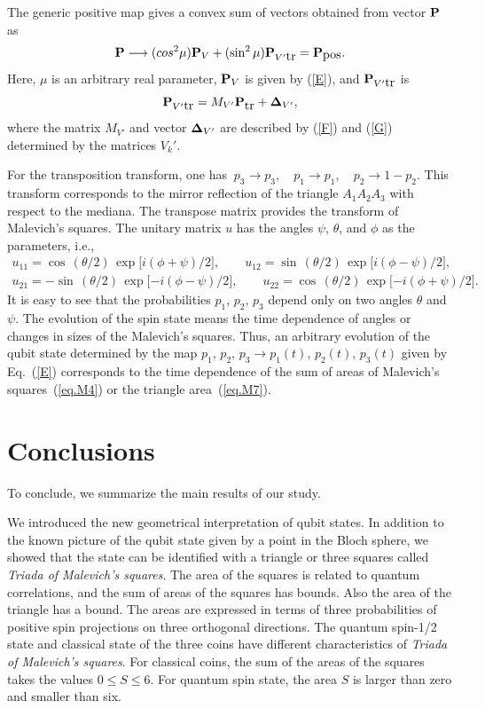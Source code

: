 \documentclass[12pt]{article}
\begin{document}
The generic positive map gives a convex sum of vectors obtained from vector ${\bf P}$ as
\[
{\bf P}\longrightarrow(cos^2\mu){\bf P}_V+(\sin^2\mu){\bf P}_{V'\mbox{tr}}={\bf P}_{\mbox{pos}}.
\]
Here, $\mu$ is an arbitrary real parameter, ${\bf P}_V $ is given by
(\ref{E}), and ${\bf P}_{V'\mbox{tr}}$ is
\[
{\bf P}_{V'\mbox{tr}}=M_{V'}{\bf P}_{\mbox{tr}}+{\bf \Delta}_{V'},
\]
where the matrix $M_{V'}$ and vector ${\bf \Delta}_{V'}$ are described  by (\ref{F})
and (\ref{G}) determined by the matrices $V_k'$.

For the transposition transform, one has $~p_3\longrightarrow
p_3,\quad p_1\longrightarrow p_1, \quad p_2\longrightarrow1-p_2.$
This transform corresponds to the mirror reflection of the triangle
$A_1A_2A_3$ with respect to the mediana. The transpose matrix
provides the transform of Malevich's squares. The unitary matrix $u$
has the angles $\psi$, $\theta$, and $\phi$ as the parameters, i.e.,
\begin{eqnarray*}
u_{11}=\cos\,({\theta}/{2})\,\exp\big[{i(\phi+\psi)}/{2}\big],
\qquad
u_{12}=\sin\,({\theta}/{2})\,\exp\big[{i(\phi-\psi)}/{2}\big],\\
u_{21}=-\sin\,({\theta}/{2})\,\exp\big[{-i(\phi-\psi)}/{2}\big],
\qquad u_{22}=\cos\,({\theta}/{2})\,\exp\big[{-i(\phi+\psi)}/{2}\big].
\end{eqnarray*}
It is easy to see that the probabilities $p_1,\,p_2,\,p_3$ depend
only on two angles $\theta$ and $\psi$. The evolution of the spin
state means the time dependence of angles or changes in sizes of the
Malevich's squares. Thus, an arbitrary evolution of the qubit state
determined by the map $p_1,\,p_2,\,p_3\longrightarrow
p_1(t),\,p_2(t),\,p_3(t)$ given by Eq.~(\ref{E}) corresponds to the
time dependence of the sum of areas of Malevich's
squares~(\ref{eq.M4}) or the triangle area~(\ref{eq.M7}).\\[-5.1mm]

\section{Conclusions}   
To conclude, we summarize the main results of our study.

We introduced the new geometrical interpretation of qubit states. In
addition to the known picture of the qubit state given by a point in
the Bloch sphere, we showed that the state can be identified with a
triangle or three squares called {\it Triada of Malevich's squares}.
The area of the squares is related to quantum correlations, and the
sum of areas of the squares has bounds. Also the area of the
triangle has a bound. The areas are expressed in terms of three
probabilities of positive spin projections on three orthogonal
directions. The quantum spin-1/2 state and classical state of the
three coins have different characteristics of {\it Triada of
Malevich's squares}. For classical coins, the sum of the areas of
the squares takes the values $0\leq S \leq 6$. For quantum spin
state, the area $S$ is larger than zero and smaller than six.
\end{document}
